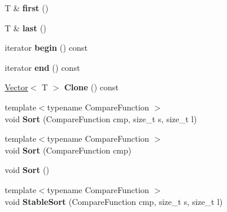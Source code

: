 \begin{DoxyCompactItemize}
\item 
T \& {\bfseries first} ()\hypertarget{classv8_1_1internal_1_1_vector_a13e9fef6a9a3f72da9b4c93d21e089ab}{}\label{classv8_1_1internal_1_1_vector_a13e9fef6a9a3f72da9b4c93d21e089ab}

\item 
T \& {\bfseries last} ()\hypertarget{classv8_1_1internal_1_1_vector_a5e900c0bafc9fe198955b4013cbf90dc}{}\label{classv8_1_1internal_1_1_vector_a5e900c0bafc9fe198955b4013cbf90dc}

\item 
iterator {\bfseries begin} () const \hypertarget{classv8_1_1internal_1_1_vector_a56cc693c0457ce95ed9cdd093eac95df}{}\label{classv8_1_1internal_1_1_vector_a56cc693c0457ce95ed9cdd093eac95df}

\item 
iterator {\bfseries end} () const \hypertarget{classv8_1_1internal_1_1_vector_a616b227e35369d6e76013f01b6512cf9}{}\label{classv8_1_1internal_1_1_vector_a616b227e35369d6e76013f01b6512cf9}

\item 
\hyperlink{classv8_1_1internal_1_1_vector}{Vector}$<$ T $>$ {\bfseries Clone} () const \hypertarget{classv8_1_1internal_1_1_vector_add01b651ef9015bdbe8f3b3228f07bc8}{}\label{classv8_1_1internal_1_1_vector_add01b651ef9015bdbe8f3b3228f07bc8}

\item 
{\footnotesize template$<$typename Compare\+Function $>$ }\\void {\bfseries Sort} (Compare\+Function cmp, size\+\_\+t s, size\+\_\+t l)\hypertarget{classv8_1_1internal_1_1_vector_a4cb320f5a69e71d66431a5406cbdf2b0}{}\label{classv8_1_1internal_1_1_vector_a4cb320f5a69e71d66431a5406cbdf2b0}

\item 
{\footnotesize template$<$typename Compare\+Function $>$ }\\void {\bfseries Sort} (Compare\+Function cmp)\hypertarget{classv8_1_1internal_1_1_vector_aa287135a0f6de0235a1bf8f3d425220f}{}\label{classv8_1_1internal_1_1_vector_aa287135a0f6de0235a1bf8f3d425220f}

\item 
void {\bfseries Sort} ()\hypertarget{classv8_1_1internal_1_1_vector_a1914139a503a171e777f3d0b951069aa}{}\label{classv8_1_1internal_1_1_vector_a1914139a503a171e777f3d0b951069aa}

\item 
{\footnotesize template$<$typename Compare\+Function $>$ }\\void {\bfseries Stable\+Sort} (Compare\+Function cmp, size\+\_\+t s, size\+\_\+t l)\hypertarget{classv8_1_1internal_1_1_vector_a331d883c24f767fbfb6fb9dcbf0e6942}{}\label{classv8_1_1internal_1_1_vector_a331d883c24f767fbfb6fb9dcbf0e6942}


\end{DoxyCompactItemize}
